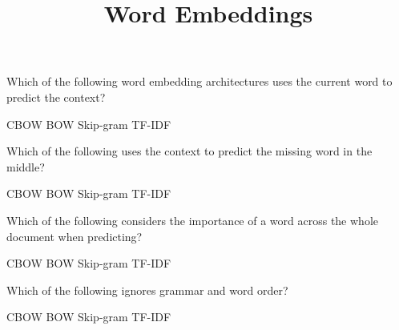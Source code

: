 \documentclass[theme=sleek, randomorder, hidesidemenu]{webquiz}
\title{Word Embeddings}
\begin{document}
\begin{question}
  Which of the following word embedding architectures uses the current word to predict the context?
  \begin{choice}
    \incorrect CBOW
    \incorrect BOW
    \correct Skip-gram
    \incorrect TF-IDF
  \end{choice}
\end{question}

\begin{question}
  Which of the following uses the context to predict the missing word in the middle?
  \begin{choice}
    \correct CBOW
    \incorrect BOW
    \incorrect Skip-gram
    \incorrect TF-IDF
  \end{choice}
\end{question}

\begin{question}
  Which of the following considers the importance of a word across the whole document when predicting?
  \begin{choice}
    \incorrect CBOW
    \incorrect BOW
    \incorrect Skip-gram
    \correct TF-IDF
  \end{choice}
\end{question}

\begin{question}
  Which of the following ignores grammar and word order?
  \begin{choice}
    \incorrect CBOW
    \correct BOW
    \incorrect Skip-gram
    \incorrect TF-IDF
  \end{choice}
\end{question}


\end{document}
